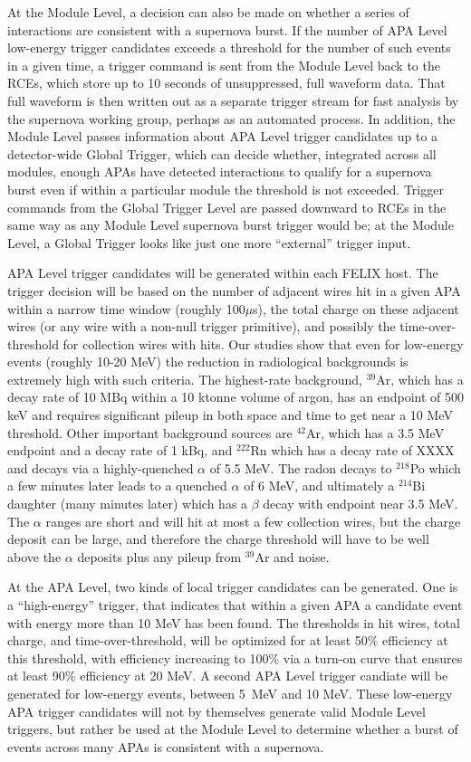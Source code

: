        At the Module Level, a decision can also be made on whether a series of
interactions are consistent with a supernova burst.  If the number of APA Level
low-energy trigger candidates exceeds a threshold for the number of such events
in a given time, a trigger command is sent from the Module Level back to the
RCEs, which store up to 10 seconds of unsuppressed, full waveform data.  That
full waveform is then written out as a separate trigger stream for fast
analysis by the supernova working group, perhaps as an automated process.  In
addition, the Module Level passes information about APA Level trigger
candidates  up to a detector-wide Global Trigger, which can decide whether,
integrated across all modules, enough APAs have detected interactions to
qualify for a supernova burst even if within a particular module the threshold
is not exceeded. Trigger commands from the Global Trigger Level are passed
downward to RCEs in the same way as any Module Level supernova burst trigger
would be; at the Module Level, a Global Trigger looks like just one more
``external'' trigger input.

	APA Level trigger candidates will be generated within each FELIX
host.  The trigger decision will be based on the number of adjacent wires hit
in a given APA within a narrow time window (roughly 100$\mu$s), the total
charge on these adjacent wires (or any wire with a non-null trigger primitive),
and possibly the time-over-threshold for collection wires with hits. Our
studies show that even for low-energy events (roughly 10-20 MeV) the reduction
in radiological backgrounds is extremely high with such criteria. The
highest-rate background, $^{39}$Ar, which has a decay rate of 10 MBq within a
10 ktonne volume of argon, has an endpoint of 500 keV and requires significant
pileup in both space and time to get near a 10 MeV threshold. Other important
background sources are $^{42}$Ar, which has a 3.5 MeV endpoint and a decay rate
of 1 kBq, and $^{222}$Rn which has a decay rate of XXXX and decays via a
highly-quenched $\alpha$ of 5.5 MeV.  The radon decays to $^{218}$Po which
a few minutes later leads to a quenched $\alpha$ of 6 MeV, and ultimately a
$^{214}$Bi daughter (many minutes later) which has a $\beta$ decay with
endpoint near 3.5 MeV.  The $\alpha$ ranges are short and will hit at most a
few collection wires, but the charge deposit can be large, and therefore the
charge threshold will have to be well above the $\alpha$ deposits plus any
pileup from $^{39}$Ar and noise.

	At the APA Level, two kinds of local trigger candidates can be
generated. One is a ``high-energy'' trigger, that indicates that within a given
APA a candidate event with energy more than 10 MeV has been found. The
thresholds in hit wires, total charge, and time-over-threshold, will be
optimized for at least 50\% efficiency at this threshold, with efficiency
increasing to 100\% via a turn-on curve that ensures at least 90\% efficiency
at 20 MeV.  A second APA Level trigger candiate will be generated for
low-energy events, between 5~MeV and 10 MeV. These low-energy APA trigger
candidates will not by themselves generate valid  Module Level triggers, but
rather be used at the Module Level to determine whether a burst of events
across many APAs is consistent with a supernova.

